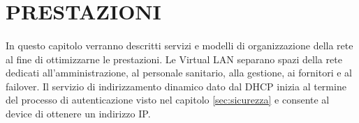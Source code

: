 \section{PRESTAZIONI}
\paragraph{} In questo capitolo verranno descritti servizi e modelli di organizzazione della rete al fine di ottimizzarne le prestazioni. Le Virtual LAN separano spazi della rete dedicati all'amministrazione, al personale sanitario, alla gestione, ai fornitori e al failover. Il servizio di indirizzamento dinamico dato dal DHCP inizia al termine del processo di autenticazione visto nel capitolo \ref{sec:sicurezza} e consente al device di ottenere un indirizzo IP.




